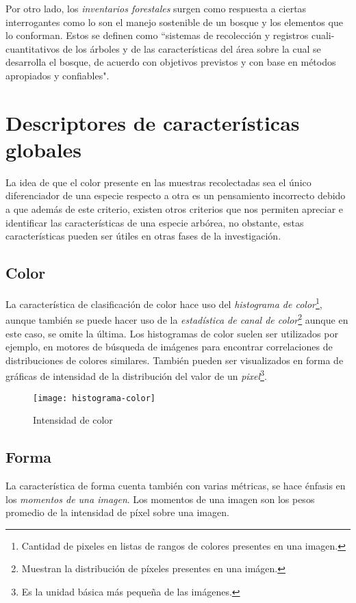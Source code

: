 Por otro lado, los \emph{inventarios forestales} surgen como respuesta a ciertas interrogantes como lo son el manejo sostenible de un bosque y los elementos que lo conforman. Estos se definen como ``sistemas de recolección y registros cuali-cuantitativos de los árboles y de las características del área sobre la cual se desarrolla el bosque, de acuerdo con objetivos previstos y con base en métodos apropiados y confiables"\cite{rf7}.

\section{Descriptores de características globales}
La idea de que el color presente en las muestras recolectadas sea el único diferenciador de una especie respecto a otra es un pensamiento incorrecto debido a que además de este criterio, existen otros criterios que nos permiten apreciar e identificar las características de una especie arbórea, no obstante, estas características pueden ser útiles en otras fases de la investigación. 

\subsection{Color}
La característica de clasificación de color hace uso del \emph{histograma de color}\footnote{Cantidad de pixeles en listas de rangos de colores presentes en una imagen.}, aunque también se puede hacer uso de la \emph{estadística de canal de color}\footnote{Muestran la distribución de píxeles presentes en una imágen.} aunque en este caso, se omite la última. Los histogramas de color suelen ser utilizados por ejemplo, en motores de búsqueda de imágenes para encontrar correlaciones de distribuciones de colores similares. También pueden ser visualizados en forma de gráficas de intensidad de la distribución del valor de un \emph{pixel}\footnote{Es la unidad básica más pequeña de las imágenes.}.


\begin{figure}[h!]
  \centering
  \begin{minipage}[b]{0.7\textwidth}
    \texttt{[image: histograma-color]}
    \caption{Intensidad de color}
  \end{minipage}
\end{figure}


\subsection{Forma}
La característica de forma cuenta también con varias métricas, se hace énfasis en los \emph{momentos de una imagen}. 
Los momentos de una imagen son los pesos promedio de la intensidad de píxel sobre una imagen.  


